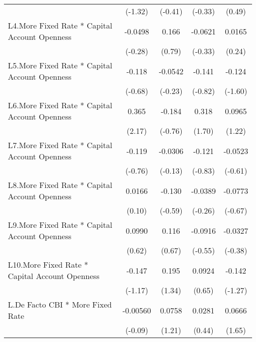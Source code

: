{\begin{longtable}{l*{4}{c}}
                &  (-1.32)         &  (-0.41)         &  (-0.33)         &   (0.49)         \\
\addlinespace
L4.More Fixed Rate * Capital Account Openness&  -0.0498         &    0.166         &  -0.0621         &   0.0165         \\
                &  (-0.28)         &   (0.79)         &  (-0.33)         &   (0.24)         \\
\addlinespace
L5.More Fixed Rate * Capital Account Openness&   -0.118         &  -0.0542         &   -0.141         &   -0.124         \\
                &  (-0.68)         &  (-0.23)         &  (-0.82)         &  (-1.60)         \\
\addlinespace
L6.More Fixed Rate * Capital Account Openness&    0.365\sym{*}  &   -0.184         &    0.318         &   0.0965         \\
                &   (2.17)         &  (-0.76)         &   (1.70)         &   (1.22)         \\
\addlinespace
L7.More Fixed Rate * Capital Account Openness&   -0.119         &  -0.0306         &   -0.121         &  -0.0523         \\
                &  (-0.76)         &  (-0.13)         &  (-0.83)         &  (-0.61)         \\
\addlinespace
L8.More Fixed Rate * Capital Account Openness&   0.0166         &   -0.130         &  -0.0389         &  -0.0773         \\
                &   (0.10)         &  (-0.59)         &  (-0.26)         &  (-0.67)         \\
\addlinespace
L9.More Fixed Rate * Capital Account Openness&   0.0990         &    0.116         &  -0.0916         &  -0.0327         \\
                &   (0.62)         &   (0.67)         &  (-0.55)         &  (-0.38)         \\
\addlinespace
L10.More Fixed Rate * Capital Account Openness&   -0.147         &    0.195         &   0.0924         &   -0.142         \\
                &  (-1.17)         &   (1.34)         &   (0.65)         &  (-1.27)         \\
\addlinespace
L.De Facto CBI * More Fixed Rate& -0.00560         &   0.0758         &   0.0281         &   0.0666         \\
                &  (-0.09)         &   (1.21)         &   (0.44)         &   (1.65)         \\

\end{longtable}}
